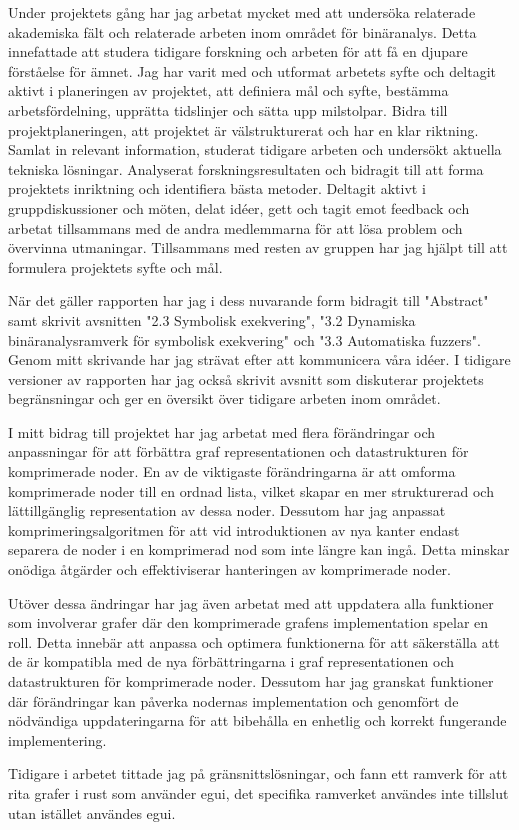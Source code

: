 
Under projektets gång har jag arbetat mycket med att undersöka relaterade akademiska fält och relaterade arbeten inom området för binäranalys.
Detta innefattade att studera tidigare forskning och arbeten för att få en djupare förståelse för ämnet. Jag har varit med och utformat arbetets syfte och
deltagit aktivt i planeringen av projektet, att definiera mål och syfte, bestämma arbetsfördelning, upprätta tidslinjer och sätta upp milstolpar.
Bidra till projektplaneringen, att projektet är välstrukturerat och har en klar riktning. Samlat in relevant information, studerat
tidigare arbeten och undersökt aktuella tekniska lösningar. Analyserat forskningsresultaten och bidragit till att forma projektets inriktning och
identifiera bästa metoder. Deltagit aktivt i gruppdiskussioner och möten, delat idéer, gett och tagit emot feedback och arbetat tillsammans med
de andra medlemmarna för att lösa problem och övervinna utmaningar. Tillsammans med resten av gruppen har jag hjälpt till att formulera projektets syfte och mål.

När det gäller rapporten har jag i dess nuvarande form bidragit till "Abstract" samt skrivit avsnitten "2.3 Symbolisk exekvering",
"3.2 Dynamiska binäranalysramverk för symbolisk exekvering" och "3.3 Automatiska fuzzers". Genom mitt skrivande har jag strävat efter att
kommunicera våra idéer. I tidigare versioner av rapporten har jag också skrivit avsnitt som diskuterar projektets begränsningar och ger
en översikt över tidigare arbeten inom området.

I mitt bidrag till projektet har jag arbetat med flera förändringar och anpassningar för att förbättra graf
representationen och datastrukturen för komprimerade noder. En av de viktigaste förändringarna är att omforma
komprimerade noder till en ordnad lista, vilket skapar en mer strukturerad och lättillgänglig representation av dessa noder.
Dessutom har jag anpassat komprimeringsalgoritmen för att vid introduktionen av nya kanter endast separera de noder
i en komprimerad nod som inte längre kan ingå. Detta minskar onödiga åtgärder och effektiviserar hanteringen av
komprimerade noder.

Utöver dessa ändringar har jag även arbetat med att uppdatera alla funktioner som involverar grafer där den komprimerade grafens
implementation spelar en roll. Detta innebär att anpassa och optimera funktionerna för att säkerställa att de är kompatibla med
de nya förbättringarna i graf representationen och datastrukturen för komprimerade noder. Dessutom har jag granskat funktioner där
förändringar kan påverka nodernas implementation och genomfört de nödvändiga uppdateringarna för att bibehålla en enhetlig och
korrekt fungerande implementering.

Tidigare i arbetet tittade jag på gränsnittslösningar, och fann ett ramverk för att rita grafer i rust som använder egui,
det specifika ramverket användes inte tillslut utan istället användes egui.

